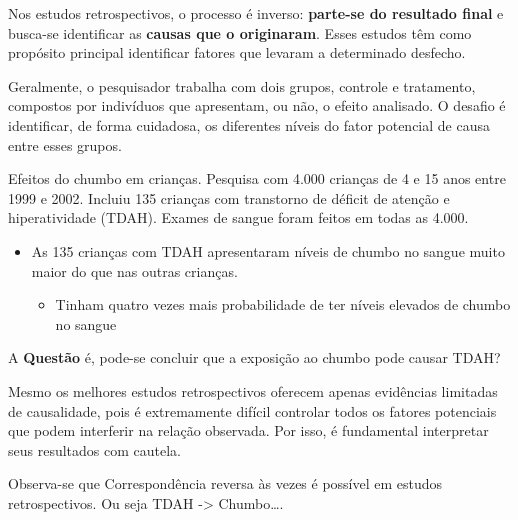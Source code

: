 \documentclass[
  letterpaper,
  DIV=11,
  numbers=noendperiod]{scrreprt}
\providecommand{\tightlist}{%
  \setlength{\itemsep}{0pt}\setlength{\parskip}{0pt}}
\begin{document}
Nos estudos retrospectivos, o processo é inverso: \textbf{parte-se do
resultado final} e busca-se identificar as \textbf{causas que o
originaram}. Esses estudos têm como propósito principal identificar
fatores que levaram a determinado desfecho.

Geralmente, o pesquisador trabalha com dois grupos, controle e
tratamento, compostos por indivíduos que apresentam, ou não, o efeito
analisado. O desafio é identificar, de forma cuidadosa, os diferentes
níveis do fator potencial de causa entre esses grupos.

\begin{tcolorbox}[enhanced jigsaw, leftrule=.75mm, coltitle=black, colframe=quarto-callout-tip-color-frame, toprule=.15mm, opacitybacktitle=0.6, bottomtitle=1mm, bottomrule=.15mm, titlerule=0mm, toptitle=1mm, title=\textcolor{quarto-callout-tip-color}{\faLightbulb}\hspace{0.5em}{Explicando com Exemplo}, arc=.35mm, breakable, opacityback=0, colbacktitle=quarto-callout-tip-color!10!white, colback=white, left=2mm, rightrule=.15mm]

Efeitos do chumbo em crianças. Pesquisa com 4.000 crianças de 4 e 15
anos entre 1999 e 2002. Incluiu 135 crianças com transtorno de déficit
de atenção e hiperatividade (TDAH). Exames de sangue foram feitos em
todas as 4.000.

\begin{itemize}
\tightlist
\item
  As 135 crianças com TDAH apresentaram níveis de chumbo no sangue muito
  maior do que nas outras crianças.

  \begin{itemize}
  \tightlist
  \item
    Tinham quatro vezes mais probabilidade de ter níveis elevados de
    chumbo no sangue
  \end{itemize}
\end{itemize}

A \textbf{Questão} é, pode-se concluir que a exposição ao chumbo pode
causar TDAH?

\end{tcolorbox}

Mesmo os melhores estudos retrospectivos oferecem apenas evidências
limitadas de causalidade, pois é extremamente difícil controlar todos os
fatores potenciais que podem interferir na relação observada. Por isso,
é fundamental interpretar seus resultados com cautela.

Observa-se que Correspondência reversa às vezes é possível em estudos
retrospectivos. Ou seja TDAH -\textgreater{} Chumbo\ldots.
\end{document}
